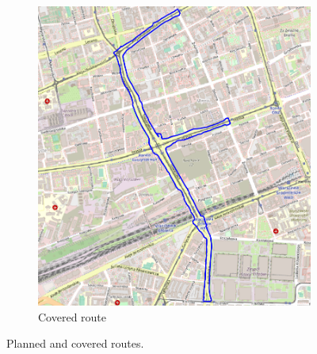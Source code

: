 \documentclass[a4paper,12pt]{article}
\begin{document}
\begin{enumerate}
\begin{figure}[H]
\begin{subfigure}{.63\textwidth}
			\includegraphics[width=1\linewidth]{route_c16}
			\caption{Covered route}
			\label{fig:b16}
		\end{subfigure}
		\caption{Planned and covered routes.}
		\label{fig:fig16}
	\end{figure} 
\end{enumerate}
\end{document}
